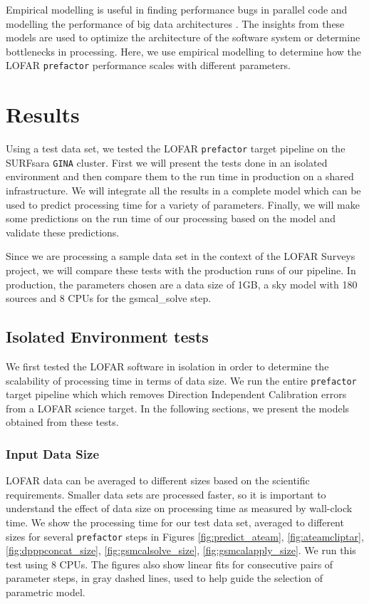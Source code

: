 \documentclass[preprint,5p]{elsarticle}
\begin{document}
Empirical modelling is useful in finding performance bugs in parallel code \citep{scalability_bugs} and modelling the performance of big data architectures \citep{mean_field_modeling}. The insights from these models are used to optimize the architecture of the software system or determine bottlenecks in processing. Here, we use empirical modelling to determine how the LOFAR \texttt{prefactor} performance scales with different parameters. 




\section{Results}\label{sec:results}

Using a test data set, we tested the LOFAR \texttt{prefactor} target pipeline on the SURFsara \texttt{GINA} cluster. First we will present the tests done in an isolated environment and then compare them to the run time in production on a shared infrastructure. We will integrate all the results in a complete model which can be used to predict processing time for a variety of parameters. Finally, we will make some predictions on the run time of our processing based on the model and validate these predictions. 

Since we are  processing a sample data set in the context of the LOFAR Surveys project, we will compare these tests with the production runs of our pipeline. In production, the parameters chosen are a data size of 1GB, a sky model with 180 sources and 8 CPUs for the {\selectfont gsmcal\_solve} step. 
 

\subsection{Isolated Environment tests}
We first tested the LOFAR software in isolation in order to determine the scalability of processing time in terms of data size. We run the entire \texttt{prefactor} target pipeline which which removes Direction Independent Calibration errors from a LOFAR science target. In the following sections, we present the models obtained from these tests.  

\subsubsection{Input Data Size}\label{sec:results_size}
LOFAR data can be averaged to different sizes based on the scientific requirements. Smaller data sets are processed faster, so it is important to understand the effect of data size on processing time as measured by wall-clock time. We show the processing time for our test data set, averaged to different sizes for several \texttt{prefactor} steps in Figures \ref{fig:predict_ateam}, \ref{fig:ateamcliptar}, \ref{fig:dpppconcat_size}, \ref{fig:gsmcalsolve_size}, \ref{fig:gsmcalapply_size}. We run this test using 8 CPUs. The figures also show linear fits for consecutive pairs of parameter steps, in gray dashed lines, used to help guide the selection of parametric model. 
\end{document}

